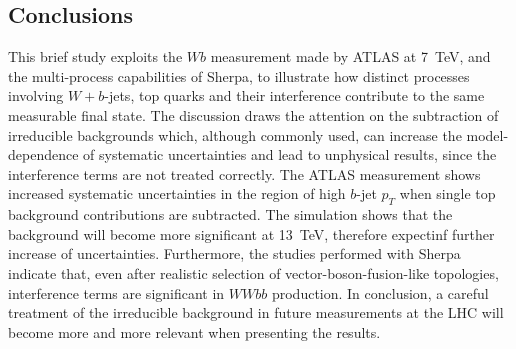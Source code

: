 \documentclass[11pt]{cernrep}
\begin{document}
\subsection{Conclusions}\label{sec:conclusions}

This brief study exploits the $Wb$ measurement made by ATLAS at 7~TeV, 
and the multi-process capabilities of Sherpa,
to illustrate how distinct processes involving $W+b$-jets, 
top quarks and their interference contribute to the same measurable final state.
The discussion draws the attention on the subtraction of irreducible backgrounds which, although commonly used,
can increase the model-dependence of systematic uncertainties and lead to unphysical results,
since the interference terms are not treated correctly. 
The ATLAS measurement shows increased systematic
uncertainties in the region of high $b$-jet $p_T$ when single top background contributions are subtracted.
The simulation shows that the background will become more significant at 13~TeV, therefore expectinf further increase of uncertainties.
Furthermore, the studies performed with Sherpa indicate that, even after realistic selection of vector-boson-fusion-like topologies, 
interference terms are significant in $WWbb$ production. 
In conclusion, a careful treatment of the irreducible background in future measurements at the LHC 
will become more and more relevant when presenting the results.


\end{document}
